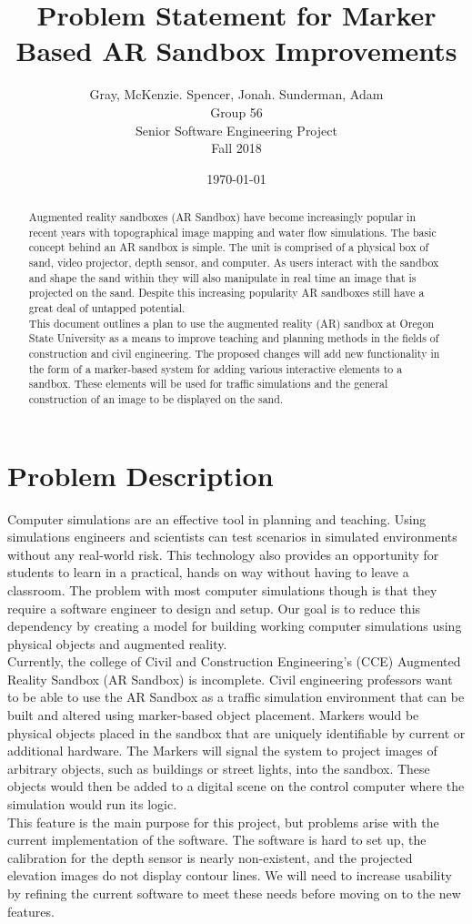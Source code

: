 \documentclass[letterpaper, 10pt, onecolumn, draftclsnofoot]{IEEEtran}
\title{Problem Statement for Marker Based AR Sandbox Improvements}
\author{Gray, McKenzie. Spencer, Jonah. Sunderman, Adam\\Group 56\\Senior Software Engineering Project\\Fall 2018}
\date{\today}
\begin{document}
\maketitle
\begin{abstract}
Augmented reality sandboxes (AR Sandbox) have become increasingly popular in recent years with topographical image mapping and water flow simulations. The basic concept behind an AR sandbox is simple. The unit is comprised of a physical box of sand, video projector, depth sensor, and computer. As users interact with the sandbox and shape the sand within they will also manipulate in real time an image that is projected on the sand. Despite this increasing popularity AR sandboxes still have a great deal of untapped potential.
\\
This document outlines a plan to use the augmented reality (AR) sandbox at Oregon State University as a means to improve teaching and planning methods in the fields of construction and civil engineering. The proposed changes will add new functionality in the form of a marker-based system for adding various interactive elements to a sandbox. These elements will be used for traffic simulations and the general construction of an image to be displayed on the sand.
\end{abstract}
\newpage

\section{Problem Description} 
 Computer simulations are an effective tool in planning and teaching. Using simulations engineers and scientists can test scenarios in simulated environments without any real-world risk. This technology also provides an opportunity for students to learn in a practical, hands on way without having to leave a classroom. The problem with most computer simulations though is that they require a software engineer to design and setup. Our goal is to reduce this dependency by creating a model for building working computer simulations using physical objects and augmented reality.
\\
Currently, the college of Civil and Construction Engineering's (CCE) Augmented Reality Sandbox (AR Sandbox) is incomplete. Civil engineering professors want to be able to use the AR Sandbox as a traffic simulation environment that can be built and altered using marker-based object placement. Markers would be physical objects placed in the sandbox that are uniquely identifiable by current or additional hardware. The Markers will signal the system to project images of arbitrary objects, such as buildings or street lights, into the sandbox. These objects would then be added to a digital scene on the control computer where the simulation would run its logic.
\\
This feature is the main purpose for this project, but problems arise with the current implementation of the software. The software is hard to set up, the calibration for the depth sensor is nearly non-existent, and the projected elevation images do not display contour lines. We will need to increase usability by refining the current software to meet these needs before moving on to the new features.
\end{document}
